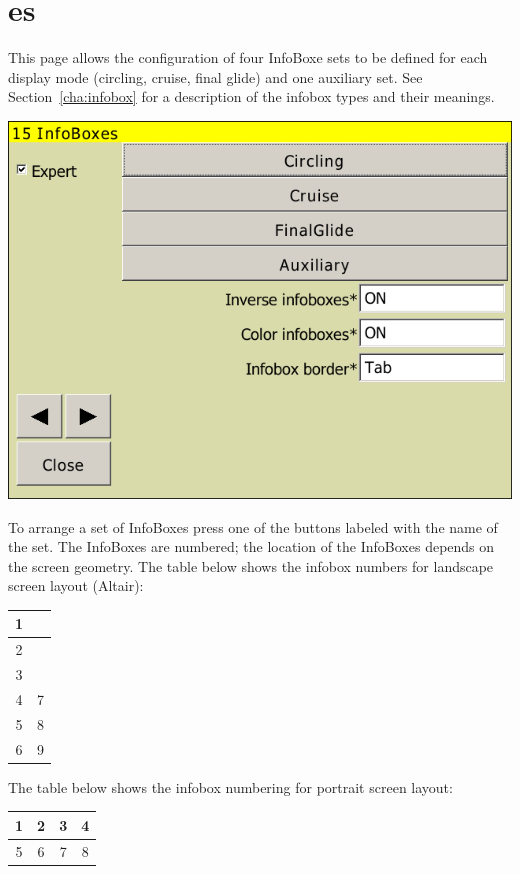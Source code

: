 
\clearpage
\section{{\InfoBox}es}

This page allows the configuration of four InfoBoxe sets to be defined for each
display mode (circling, cruise, final glide) and one auxiliary set.  See
Section~\ref{cha:infobox} for a description of the infobox types and their meanings.

\begin{center}
\includegraphics[angle=0,width=0.8\linewidth,keepaspectratio='true']{figures/config-infoboxes.png}
\end{center}

To arrange a set of InfoBoxes press one of the buttons labeled with the name
of the set.  The InfoBoxes are numbered; the location of the InfoBoxes depends
on the screen geometry.  The table below shows the infobox numbers for landscape screen layout (Altair):

\begin{tabular}{|c|c|}
\hline
1 &  \\
\hline
2 &  \\
\hline
3 &  \\
\hline
4 & 7 \\
\hline
5 & 8 \\
\hline
6 & 9 \\
\hline
\end{tabular}

The table below shows the infobox numbering for portrait screen layout:

\begin{tabular}{|c|c|c|c|}
\hline
1 & 2 & 3 & 4 \\
\hline
\hline
5 & 6 & 7 & 8 \\
\hline
\end{tabular}

